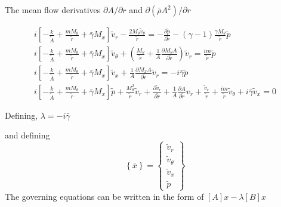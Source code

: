 The mean flow derivatives $\partial A/ \partial r$ and $\partial (\bar{\rho} A^2) /\partial r $

    
\begin{align} 
        i\left[ 
            - \frac{k}{\tilde{A}} + 
            \frac{m M_{\theta}}{\tilde{r}} + 
            \bar{\gamma} M_x 
        \right] \tilde{v}_r - 
        \frac{2 M_{\theta} \tilde{v}_{\theta}}{\tilde{r}} = 
        -\frac{\partial \tilde{p}}{\partial \tilde{r}} -
        (\gamma-1)\frac{\gamma M_{\theta}}{\tilde{r}}\tilde{p}\\
        i\left[ - \frac{k}{\tilde{A}} +
        \frac{m M_{\theta}}{\tilde{r}} + \bar{\gamma} M_x \right] 
        \tilde{v}_{\theta} + \left(\frac{ M_{\theta}}{\tilde{r}}  + 
        \frac{1}{A} \frac{\partial M_{\theta}A}{\partial \tilde{r}}\right)
        \tilde{v}_r = \frac{i m}{\tilde{r}}\tilde{p}\\
        i\left[ - \frac{k}{\tilde{A}} + \frac{m M_{\theta}}{\tilde{r}} + 
        \bar{\gamma} M_x \right] \tilde{v}_x  + \frac{1}{A} 
        \frac{\partial M_x A}{\partial \tilde{r}}\tilde{v}_r =
        -i \bar{\gamma}\tilde{p} \\ 
        i \left[ -\frac{k}{\tilde{A}} + 
            \frac{mM_{\theta}}{\tilde{r}} +
        \bar{\gamma}M_x \right] \tilde{p} + 
        \frac{M_{\theta}^2}{\tilde{r}}\tilde{v}_r + 
        \frac{\partial \tilde{v}_r}{\partial \tilde{r}} +
        \frac{1}{A}\frac{\partial A}{\partial \tilde{r}}{v}_r+ 
        \frac{\tilde{v}_r  }{\tilde{r}} + \frac{im}{\tilde{r}}\tilde{v}_\theta + i \bar{\gamma} \tilde{v}_x = 0
\end{align}

Defining, $\lambda = -i \bar{\gamma} $ 

and defining 
\[ \left\{ \bar{x} \right\} =
\begin{Bmatrix}
    \tilde{v}_r \\
    \tilde{v}_{\theta} \\
    \tilde{v}_x \\
    \tilde{p}
\end{Bmatrix}
\]
The governing equations can be written in the form of $[A]{x} - \lambda [B]{x}$

